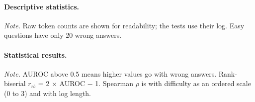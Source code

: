 \paragraph{Descriptive statistics.}

\begin{table}[htbp]
\centering
\caption{Trace features for Qwen3-4B thinking (seed 42) by correctness and difficulty, median [interquartile range].}
\label{tab:descriptives}
\scriptsize
\setlength{\tabcolsep}{3pt}
\resizebox{\linewidth}{!}{}

\vspace{2pt}
\begin{minipage}{\linewidth}\scriptsize
\textit{Note.} Raw token counts are shown for readability; the tests use their log. Easy questions have only 20 wrong answers.
\end{minipage}
\end{table}

\paragraph{Statistical results.}

\begin{table}[htbp]
\centering
\caption{Single feature tests against correctness and difficulty.}
\label{tab:singletests}
\scriptsize
\setlength{\tabcolsep}{3pt}


\vspace{2pt}
\begin{minipage}{\linewidth}\scriptsize
\textit{Note.} AUROC above 0.5 means higher values go with wrong answers. Rank-biserial $r_{rb}$ = 2 $\times$ AUROC $-$ 1. Spearman $\rho$ is with difficulty as an ordered scale (0 to 3) and with log length.
\end{minipage}
\end{table}

